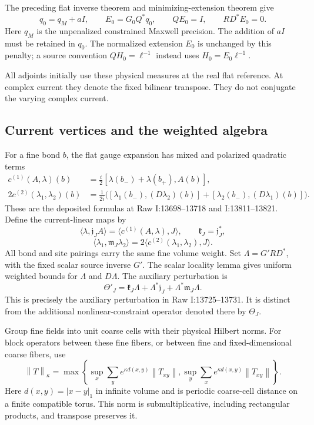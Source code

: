 \documentclass[11pt]{article}
\theoremstyle{remark}
\newcommand{\norm}[1]{\left\|#1\right\|}
\begin{document}
The preceding flat inverse theorem and minimizing-extension theorem give
\begin{equation}
 q_0=q_M+aI,
 \qquad E_0=G_0Q^*q_0,
 \qquad QE_0=I,
 \qquad RD^*E_0=0.
 \label{current-base-identities}
\end{equation}
Here $q_M$ is the unpenalized constrained Maxwell precision. The
addition of $aI$ must be retained in $q_0$. The normalized extension
$E_0$ is unchanged by this penalty; a source convention
$QH_0=\ell^{-1}$ instead uses $H_0=E_0\ell^{-1}$.

All adjoints initially use these physical measures at the real flat
reference. At complex current they denote the fixed bilinear
transpose. They do not conjugate the varying complex current.

\subsection{Current vertices and the weighted algebra}
\label{current-vertices-section}

For a fine bond $b$, the flat gauge expansion has mixed and polarized
quadratic terms
\begin{align}
 c^{(1)}(A,\lambda)(b)
 &=\frac{i}{2}[\lambda(b_-)+\lambda(b_+),A(b)],
 \label{current-c1}\\
 2c^{(2)}(\lambda_1,\lambda_2)(b)
 &=\frac{1}{2i}\bigl(
 [\lambda_1(b_-),(D\lambda_2)(b)]
 +[\lambda_2(b_-),(D\lambda_1)(b)]\bigr).
 \label{current-c2}
\end{align}
These are the deposited formulas at Raw I:13698--13718 and
I:13811--13821. Define the current-linear maps by
\[
 \langle\lambda,\mathfrak j_J A\rangle
   =\langle c^{(1)}(A,\lambda),J\rangle,
 \qquad \mathfrak k_J=\mathfrak j_J^*,
\]
\[
 \langle\lambda_1,\mathfrak m_J\lambda_2\rangle
   =2\langle c^{(2)}(\lambda_1,\lambda_2),J\rangle.
\]
All bond and site pairings carry the same fine volume weight.
Set $\Lambda=G'RD^*$, with the fixed scalar source inverse $G'$.
The scalar locality lemma gives uniform weighted bounds for
$\Lambda$ and $D\Lambda$. The auxiliary perturbation is
\begin{equation}
 \Theta'_J=\mathfrak k_J\Lambda+
       \Lambda^*\mathfrak j_J+\Lambda^*\mathfrak m_J\Lambda.
 \label{current-theta-definition}
\end{equation}
This is precisely the auxiliary perturbation in Raw I:13725--13731.
It is distinct from the additional nonlinear-constraint operator
denoted there by $\Theta_J$.

Group fine fields into unit coarse cells with their physical Hilbert
norms. For block operators between these fine fibers, or between
fine and fixed-dimensional coarse fibers, use
\begin{equation}
 \norm{T}_\kappa=
 \max\left\{
   \sup_x\sum_y e^{\kappa d(x,y)}\norm{T_{xy}},
   \sup_y\sum_x e^{\kappa d(x,y)}\norm{T_{xy}}
 \right\}.
 \label{current-schur-norm}
\end{equation}
Here $d(x,y)=|x-y|_1$ in infinite volume and is periodic coarse-cell
distance on a finite compatible torus. This norm is submultiplicative,
including rectangular products, and transpose preserves it.
\end{document}
